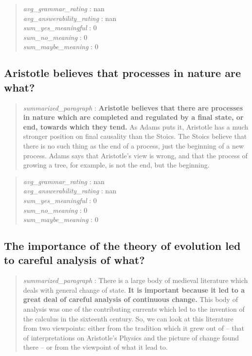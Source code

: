 \begin{quote}
\emph{avg\_grammar\_rating} : nan\\
\emph{avg\_answerability\_rating} : nan\\
\emph{sum\_yes\_meaningful} : 0\\
\emph{sum\_no\_meaning} : 0\\
\emph{sum\_maybe\_meaning} : 0
\end{quote}

\hypertarget{aristotle-believes-that-processes-in-nature-are-what}{%
\subsection{Aristotle believes that processes in nature are
what?}\label{aristotle-believes-that-processes-in-nature-are-what}}

\begin{quote}
\emph{summarized\_paragraph} : \textbf{Aristotle believes that there are
processes in nature which are completed and regulated by a final state,
or end, towards which they tend.} As Adams puts it, Aristotle has a much
stronger position on final causality than the Stoics. The Stoics believe
that there is no such thing as the end of a process, just the beginning
of a new process. Adams says that Aristotle's view is wrong, and that
the process of growing a tree, for example, is not the end, but the
beginning.
\end{quote}

\begin{quote}
\emph{avg\_grammar\_rating} : nan\\
\emph{avg\_answerability\_rating} : nan\\
\emph{sum\_yes\_meaningful} : 0\\
\emph{sum\_no\_meaning} : 0\\
\emph{sum\_maybe\_meaning} : 0
\end{quote}

\hypertarget{the-importance-of-the-theory-of-evolution-led-to-careful-analysis-of-what}{%
\subsection{The importance of the theory of evolution led to careful
analysis of
what?}\label{the-importance-of-the-theory-of-evolution-led-to-careful-analysis-of-what}}

\begin{quote}
\emph{summarized\_paragraph} : There is a large body of medieval
literature which deals with general change of state. \textbf{It is
important because it led to a great deal of careful analysis of
continuous change.} This body of analysis was one of the contributing
currents which led to the invention of the calculus in the sixteenth
century. So, we can look at this literature from two viewpoints: either
from the tradition which it grew out of -- that of interpretations on
Aristotle's Physics and the picture of change found there -- or from the
viewpoint of what it lead to.
\end{quote}

